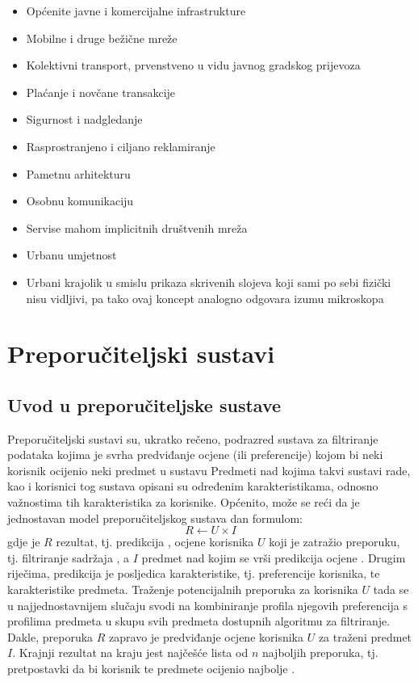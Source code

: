 \documentclass[times, utf8, diplomski, numeric]{fer}
\begin{document}
\begin{itemize}
  \item Općenite javne i komercijalne infrastrukture
  \item Mobilne i druge bežične mreže
  \item Kolektivni transport, prvenstveno u vidu javnog gradskog prijevoza
  \item Plaćanje i novčane transakcije
  \item Sigurnost i nadgledanje
  \item Rasprostranjeno i ciljano reklamiranje
  \item Pametnu arhitekturu
  \item Osobnu komunikaciju
  \item Servise mahom implicitnih društvenih mreža
  \item Urbanu umjetnost
  \item Urbani krajolik u smislu prikaza skrivenih slojeva koji sami po sebi
  fizički nisu vidljivi, pa tako ovaj koncept analogno odgovara izumu mikroskopa
\end{itemize}

\chapter{Preporučiteljski sustavi}
\section{Uvod u preporučiteljske sustave}
Preporučiteljski sustavi su, ukratko rečeno, podrazred sustava za filtriranje
podataka kojima je svrha predviđanje ocjene (ili preferencije) kojom bi neki
korisnik ocijenio neki predmet u sustavu \cite{RSHandbook} Predmeti nad kojima
takvi sustavi rade, kao i korisnici tog sustava opisani su određenim
karakteristikama, odnosno važnostima tih karakteristika za korisnike. Općenito,
može se reći da je jednostavan model preporučiteljskog sustava dan formulom:
\begin{equation}
\label{eq:elementarniModel}
	R \leftarrow U \times I
\end{equation}
gdje je $R$ rezultat, tj. predikcija ,
ocjene korisnika $U$  koji je zatražio preporuku, tj. filtriranje
sadržaja , a $I$ predmet nad kojim se vrši predikcija ocjene .
Drugim riječima, predikcija je posljedica karakteristike, tj. preferencije
korisnika, te karakteristike predmeta. Traženje potencijalnih preporuka za
korisnika $U$ tada se u najjednostavnijem slučaju svodi na kombiniranje profila
njegovih preferencija s profilima predmeta u skupu svih predmeta dostupnih
algoritmu za filtriranje.
Dakle, preporuka $R$ zapravo je predviđanje ocjene korisnika $U$ za
traženi predmet $I$. Krajnji rezultat na kraju jest najčešće lista od $n$
najboljih preporuka, tj. pretpostavki da bi korisnik te predmete ocijenio
najbolje . 
\end{document}
